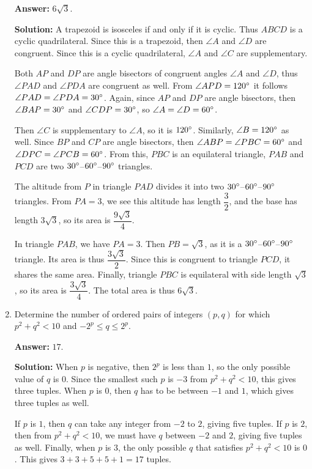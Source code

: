 \documentclass[11pt,paper=letter]{scrartcl}
\begin{document}
\begin{enumerate}[left=0pt]
\textbf{Answer:} $\boxed{6\sqrt3}$.

\textbf{Solution:} A trapezoid is isosceles if and only if it is cyclic. Thus $ABCD$ is a cyclic quadrilateral. Since this is a trapezoid, then $\angle A$ and $\angle D$ are congruent. Since this is a cyclic quadrilateral, $\angle A$ and $\angle C$ are supplementary.

Both $AP$ and $DP$ are angle bisectors of congruent angles $\angle A$ and $\angle D$, thus $\angle PAD$ and $\angle PDA$ are congruent as well. From $\angle APD = 120^\circ$ it follows $\angle PAD = \angle PDA = 30^\circ$. Again, since $AP$ and $DP$ are angle bisectors, then $\angle BAP = 30^\circ$ and $\angle CDP = 30^\circ$, so $\angle A = \angle D = 60^\circ$. 

Then $\angle C$ is supplementary to $\angle A$, so it is $120^\circ$. Similarly, $\angle B = 120^\circ$ as well. Since $BP$ and $CP$ are angle bisectors, then $\angle ABP = \angle PBC = 60^\circ$ and $\angle DPC = \angle PCB = 60^\circ$. From this, $PBC$ is an equilateral triangle, $PAB$ and $PCD$ are two $30^\circ$--$60^\circ$--$90^\circ$ triangles. 

The altitude from $P$ in triangle $PAD$ divides it into two $30^\circ$--$60^\circ$--$90^\circ$ triangles. From $PA = 3$, we see this altitude has length $\dfrac32$, and the base has length $3\sqrt3$, so its area is $\dfrac{9\sqrt3}4$.

In triangle $PAB$, we have $PA = 3$. Then $PB = \sqrt3$, as it is a $30^\circ$--$60^\circ$--$90^\circ$ triangle. Its area is thus $\dfrac{3\sqrt3}2$. Since this is congruent to triangle $PCD$, it shares the same area. Finally, triangle $PBC$ is equilateral with side length $\sqrt3$, so its area is $\dfrac{3\sqrt3}4$. The total area is thus $6\sqrt3$.

\item Determine the number of ordered pairs of integers $(p, q)$ for which $p^2 + q^2 < 10$ and $-2^p \leq q \leq 2^p$.

\textbf{Answer:} $\boxed{17}$.

\textbf{Solution:} When $p$ is negative, then $2^p$ is less than $1$, so the only possible value of $q$ is $0$. Since the smallest such $p$ is $-3$ from $p^2 + q^2 < 10$, this gives three tuples. When $p$ is $0$, then $q$ has to be between $-1$ and $1$, which gives three tuples as well.

If $p$ is $1$, then $q$ can take any integer from $-2$ to $2$, giving five tuples. If $p$ is $2$, then from $p^2 + q^2 < 10$, we must have $q$ between $-2$ and $2$, giving five tuples as well. Finally, when $p$ is $3$, the only possible $q$ that satisfies $p^2 + q^2 < 10$ is $0$. This gives $3 + 3 + 5 + 5 + 1 = 17$ tuples.


\end{enumerate}
\end{document}
